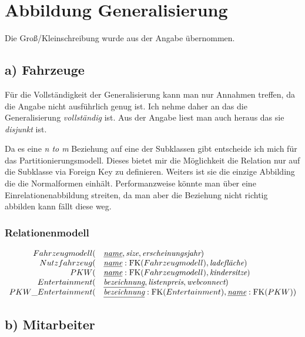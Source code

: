 \documentclass[12pt]{scrartcl}
\newcommand{\var}{\textit}
\newcommand{\PK}[1]{\underline{\var{#1}}}
\newcommand{\FK}[1]{\textup{FK}(#1)}
\newenvironment{relationalmodel}
  {\par\medskip
   \setlength{\arraycolsep}{0pt}%
   $\begin{array}{ r l }}
   {\end{array}$
   \par\medskip}
\begin{document}
\section{Abbildung Generalisierung}

Die Groß/Kleinschreibung wurde aus der Angabe übernommen.

\subsection{a) Fahrzeuge}

Für die Vollständigkeit der Generalisierung kann man nur Annahmen treffen, da die Angabe nicht ausführlich genug ist.
Ich nehme daher an das die Generalisierung \emph{vollständig} ist.
Aus der Angabe liest man auch heraus das sie \emph{disjunkt} ist.\par

Da es eine \emph{n to m} Beziehung auf eine der Subklassen gibt entscheide ich mich für das Partitionierungsmodell.
Dieses bietet mir die Möglichkeit die Relation nur auf die Subklasse via Foreign Key zu definieren.
Weiters ist sie die einzige Abbilding die die Normalformen einhält.
Performanzweise könnte man über eine Einrelationenabbildung streiten, da man aber die Beziehung nicht richtig abbilden kann fällt diese weg. \par

\subsubsection{Relationenmodell}

\begin{relationalmodel}
	Fahrzeugmodell( &
	\PK{name}, \var{size}, \var{erscheinungsjahr}) \\
	Nutzfahrzeug( &
	\PK{name} : \FK{Fahrzeugmodell}, \var{ladefläche}) \\
	PKW( &
	\PK{name} : \FK{Fahrzeugmodell}, \var{kindersitze}) \\
	Entertainment( &
	\PK{bezeichnung}, \var{listenpreis}, \var{webconnect}) \\
	PKW\_Entertainment( &
	\PK{bezeichnung} : \FK{Entertainment}, \PK{name} : \FK{PKW}) \\
\end{relationalmodel}

\subsection{b) Mitarbeiter}
\end{document}
